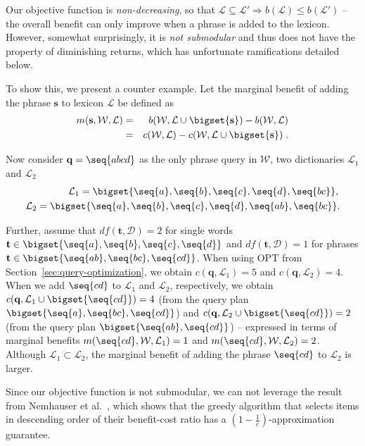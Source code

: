 Our objective function is \emph{non-decreasing}, so that
$\mathcal{L} \subseteq \mathcal{L}' \Rightarrow b(\mathcal{L}) \le
b(\mathcal{L}')$
-- the overall benefit can only improve when a phrase is added to the
lexicon. However, somewhat surprisingly, it is \emph{not
  submodular} and thus does not have the property of diminishing
returns, which has unfortunate ramifications detailed below.

To show this, we present a counter example. Let the marginal benefit
of adding the phrase $\mathbf{s}$ to lexicon $\mathcal{L}$ be
defined as
\begin{eqnarray*}
m(\mathbf{s},\mathcal{W},\mathcal{L}) & = & b(\mathcal{W}, \mathcal{L} \cup \bigset{\mathbf{s}}) - b(\mathcal{W}, \mathcal{L})\\
& = & c(\mathcal{W}, \mathcal{L}) - c(\mathcal{W}, \mathcal{L} \cup \bigset{\mathbf{s}})\;.
\end{eqnarray*}

Now consider $\mathbf{q} = \seq{abcd}$ as the only phrase query in
$\mathcal{W}$, two dictionaries $\mathcal{L}_1$ and $\mathcal{L}_2$
\begin{eqnarray*}
\mathcal{L}_1 = \bigset{\seq{a}, \seq{b}, \seq{c}, \seq{d},
   \seq{bc}},\,\\
\mathcal{L}_2 = \bigset{\seq{a}, \seq{b}, \seq{c}, \seq{d}, \seq{ab},
  \seq{bc}}.
\end{eqnarray*}

Further, assume that $df(\mathbf{t}, \mathcal{D}) = 2$ for single words
$\mathbf{t} \in \bigset{\seq{a}, \seq{b}, \seq{c}, \seq{d}}$ and
$df(\mathbf{t}, \mathcal{D}) = 1$ for phrases
$\mathbf{t} \in \bigset{\seq{ab}, \seq{bc}, \seq{cd}}$. When using OPT
from Section~\ref{sec:query-optimization}, we obtain
$c(\mathbf{q}, \mathcal{L}_1) = 5$ and
$c(\mathbf{q}, \mathcal{L}_2) = 4$. When we add $\seq{cd}$ to
$\mathcal{L}_1$ and $\mathcal{L}_2$, respectively, we obtain
$c(\mathbf{q}, \mathcal{L}_1 \cup \bigset{\seq{cd}}) = 4$ (from the
query plan $\bigset{\seq{a},\seq{bc},\seq{cd}}$) and
$c(\mathbf{q}, \mathcal{L}_2 \cup \bigset{\seq{cd}}) = 2$ (from the
query plan $\bigset{\seq{ab},\seq{cd}}$) -- expressed in terms of
marginal benefits $m(\seq{cd}, \mathcal{W}, \mathcal{L}_1) = 1$ and
$m(\seq{cd}, \mathcal{W}, \mathcal{L}_2) = 2$. Although
$\mathcal{L}_1 \subset \mathcal{L}_2$, the marginal benefit of adding
the phrase $\seq{cd}$ to $\mathcal{L}_2$ is larger.


Since our objective function is not submodular, we can not leverage
the result from Nemhauser et al.~\cite{Nemhauser:1978fk}, which shows that the greedy
algorithm that selects items in descending order of their benefit-cost
ratio has a $(1-\frac{1}{e})$-approximation guarantee.

